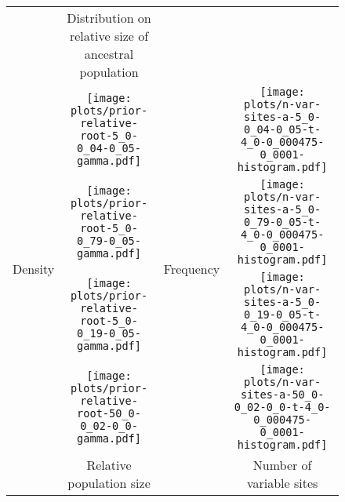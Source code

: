 \documentclass[border=10pt,varwidth=30cm]{standalone}
\begin{document}
\begin{figure}
    \centering
    \begin{tabular}{@{}cccc@{}}
        & \multirow{1}{0.15\textwidth}{\centering\Large Distribution on relative size of ancestral population}
        &
        & \\[9ex]%
        \multirow{4}{*}[-9em]{\begin{sideways}\large Density\end{sideways}}
        & \texttt{[image: plots/prior-relative-root-5\_0-0\_04-0\_05-gamma.pdf]}
        & \multirow{4}{*}[-9em]{\begin{sideways}\large Frequency\end{sideways}}
        & \texttt{[image: plots/n-var-sites-a-5\_0-0\_04-0\_05-t-4\_0-0\_000475-0\_0001-histogram.pdf]} \\
        & \texttt{[image: plots/prior-relative-root-5\_0-0\_79-0\_05-gamma.pdf]}
        &
        & \texttt{[image: plots/n-var-sites-a-5\_0-0\_79-0\_05-t-4\_0-0\_000475-0\_0001-histogram.pdf]} \\
        & \texttt{[image: plots/prior-relative-root-5\_0-0\_19-0\_05-gamma.pdf]}
        &
        & \texttt{[image: plots/n-var-sites-a-5\_0-0\_19-0\_05-t-4\_0-0\_000475-0\_0001-histogram.pdf]} \\
        & \texttt{[image: plots/prior-relative-root-50\_0-0\_02-0\_0-gamma.pdf]}
        &
        & \texttt{[image: plots/n-var-sites-a-50\_0-0\_02-0\_0-t-4\_0-0\_000475-0\_0001-histogram.pdf]} \\
        & \multirow{1}{0.15\textwidth}{\centering\large Relative population size}
        &
        & \multicolumn{1}{c}{Number of variable sites} \\
    \end{tabular}
\end{figure}
\end{document}
